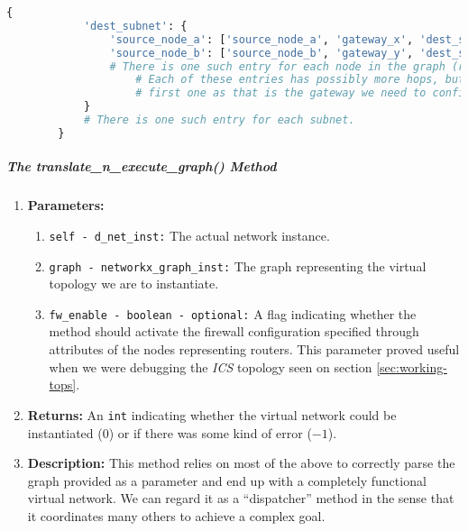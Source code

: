     \begin{lstlisting}[language = python, caption = Data Structure Containing All the Network's Routes., label = last:route-dict]
        {
            'dest_subnet': {
                'source_node_a': ['source_node_a', 'gateway_x', 'dest_subnet_bridge'],
                'source_node_b': ['source_node_b', 'gateway_y', 'dest_subnet_bridge'],
                # There is one such entry for each node in the graph (routers, bridges and hosts).
                    # Each of these entries has possibly more hops, but we are only interested in the
                    # first one as that is the gateway we need to configure.
            }
            # There is one such entry for each subnet.
        }
    \end{lstlisting}

    \subparagraph{The translate\_n\_execute\_graph() Method}
        \begin{enumerate}
            \item \textbf{Parameters:}
            \begin{enumerate}
                \item \texttt{self - d\_net\_inst:} The actual network instance.
                \item \texttt{graph - networkx\_graph\_inst:} The graph representing the virtual topology we are to instantiate.
                \item \texttt{fw\_enable - boolean - optional:} A flag indicating whether the method should activate the firewall configuration specified through attributes of the nodes representing routers. This parameter proved useful when we were debugging the \textit{ICS} topology seen on section \ref{sec:working-tops}.
            \end{enumerate}
            \item \textbf{Returns:} An \texttt{int} indicating whether the virtual network could be instantiated ($0$) or if there was some kind of error ($-1$).
            \item \textbf{Description:} This method relies on most of the above to correctly parse the graph provided as a parameter and end up with a completely functional virtual network. We can regard it as a ``dispatcher'' method in the sense that it coordinates many others to achieve a complex goal.
        \end{enumerate}

